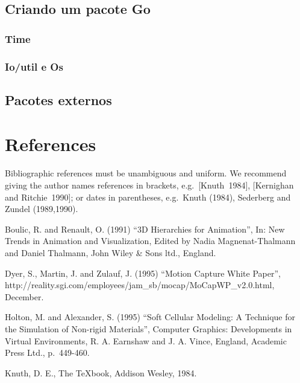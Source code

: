 \documentclass{SBCbookchapter}
\begin{document}
\subsection{Criando um pacote Go}
\subsubsection{Time}
\subsubsection{Io/util e Os}
\subsection{Pacotes externos}


\section{References}
Bibliographic references must be unambiguous and uniform.  We
recommend giving the author names references in brackets,
e.g.~[Knuth~1984], [Kernighan and Ritchie~1990]; or dates in
parentheses, e.g.~Knuth (1984), Sederberg and Zundel (1989,1990).

\begin{thebibliography}{99}
 Boulic, R. and Renault, O. (1991) ``3D Hierarchies for
  Animation'', In: New Trends in Animation and Visualization, Edited
  by Nadia Magnenat-Thalmann and Daniel Thalmann, John Wiley \& Sons
  ltd., England.

 Dyer, S., Martin, J. and Zulauf, J. (1995) ``Motion
  Capture White Paper'',
  http://reality.sgi.com/employees/jam\_sb/mocap/MoCapWP\_v2.0.html,
  December.

 Holton, M. and Alexander, S. (1995) ``Soft Cellular
  Modeling: A Technique for the Simulation of Non-rigid Materials'',
  Computer Graphics: Developments in Virtual Environments, R. A.
  Earnshaw and J. A. Vince, England, Academic Press Ltd., p.~449-460.

 Knuth, D. E., The TeXbook, Addison Wesley, 1984.
\end{thebibliography}
\end{document}
